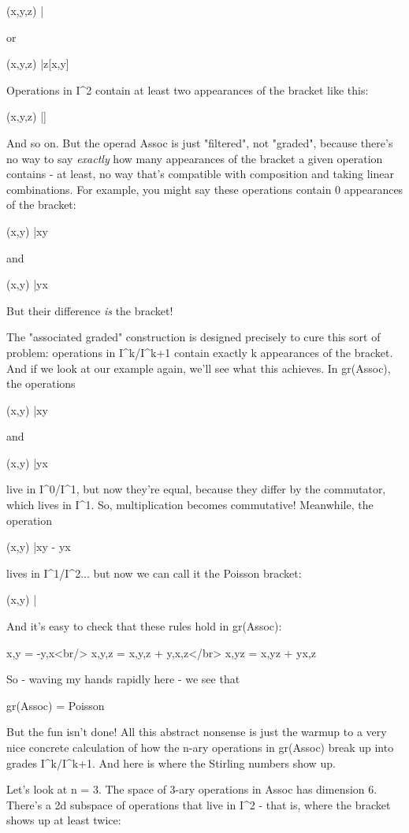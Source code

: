 (x,y,z) |\to  [xy,z]

or 

(x,y,z) |\to  z[x,y]

Operations in I^{2} contain at least two appearances of the
bracket like this:

(x,y,z) |\to  [x,[y,z]]

And so on.  But the operad Assoc is just "filtered", not
"graded", because there's no way to say \emph{exactly} how
many appearances of the bracket a given operation contains - at least,
no way that's compatible with composition and taking linear
combinations.  For example, you might say these operations contain 0
appearances of the bracket:

(x,y) |\to  xy 

and

(x,y) |\to  yx

But their difference \emph{is} the bracket!

The "associated graded" construction is designed precisely
to cure this sort of problem: operations in
I^{k}/I^{k+1} contain exactly k appearances of the
bracket.  And if we look at our example again, we'll see what this
achieves.  In gr(Assoc), the operations

(x,y) |\to  xy 

and

(x,y) |\to  yx

live in I^{0}/I^{1}, but now they're equal, because
they differ by the commutator, which lives in I^{1}.  So,
multiplication becomes commutative!  Meanwhile, the operation

(x,y) |\to  xy - yx

lives in I^{1}/I^{2}... but now we can call it the
Poisson bracket:

(x,y) |

And it's easy to check that these rules hold in gr(Assoc):

{x,y} = -{y,x}<br/>
{x,{y,z}} = {{x,y},z} + {y,{x,z}}</br>
{x,yz} = {x,y}z + y{x,z}

So - waving my hands rapidly here - we see that

gr(Assoc) = Poisson

But the fun isn't done!  All this abstract nonsense is just the warmup
to a very nice concrete calculation of how the n-ary operations in
gr(Assoc) break up into grades I^{k}/I^{k+1}.  And
here is where the Stirling numbers show up.

Let's look at n = 3.  The space of 3-ary operations in Assoc has
dimension 6.  There's a 2d subspace of operations that live in
I^{2} - that is, where the bracket shows up at least twice:

